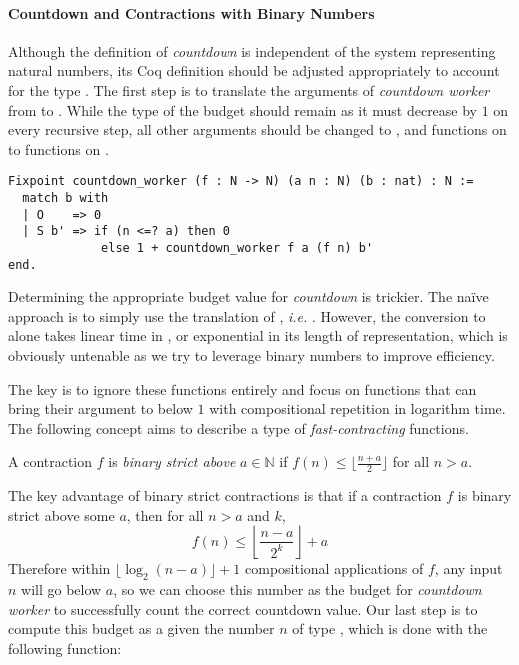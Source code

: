 \paragraph*{Countdown and Contractions with Binary Numbers}

Although the definition of \emph{countdown} is independent of the system representing natural numbers, its Coq definition should be adjusted appropriately to account for the type . The first step is to translate the arguments of \emph{countdown worker} from  to . While the type of the budget  should remain  as it must decrease by $1$ on every recursive step, all other  arguments should be changed to , and functions on  to functions on .
\begin{lstlisting}
Fixpoint countdown_worker (f : N -> N) (a n : N) (b : nat) : N :=
  match b with
  | O    => 0
  | S b' => if (n <=? a) then 0
             else 1 + countdown_worker f a (f n) b'
end.
\end{lstlisting}
Determining the appropriate budget value for \emph{countdown} is trickier. 
The naïve approach is to simply use the  translation of , 
\emph{i.e.} . However, the conversion to  alone 
takes linear time in , or exponential in its length of representation, 
which is obviously untenable as we try to leverage binary numbers 
to improve efficiency. 

The key is to ignore these functions entirely and focus on functions that can bring their argument to below $1$ with compositional repetition in logarithm time. The following concept aims to describe a type of \emph{fast-contracting} functions.
\begin{defn} \label{defn: bin-contraction}
	A contraction $f$ is \emph{binary strict above} $a\in \mathbb{N}$ if $f(n) \le \lfloor \frac{n + a}{2} \rfloor$ for all $n > a$.
\end{defn}
The key advantage of binary strict contractions is that if a contraction $f$ is binary strict above some $a$, then for all $n > a$ and $k$,
\begin{equation*}
f(n) \le \left\lfloor \frac{n - a}{2^k} \right\rfloor + a
\end{equation*}
Therefore within $\lfloor \log_2 (n - a) \rfloor + 1$ compositional applications of $f$, any input $n$ will go below $a$, so we can choose this number as the budget for \emph{countdown worker} to successfully count the correct countdown value. Our last step is to compute this budget as a  given the number $n$ of type , which is done with the following function:

